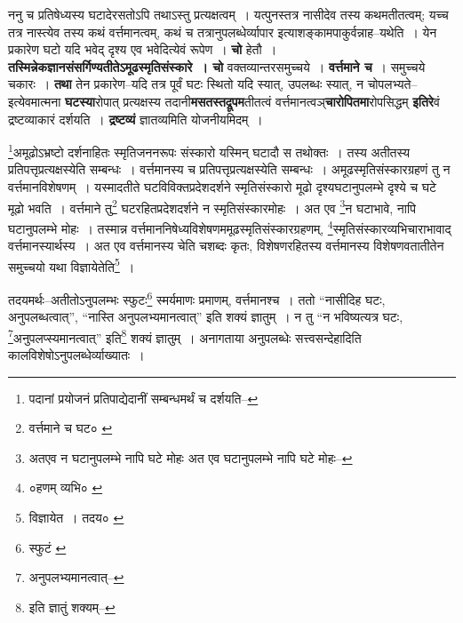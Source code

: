 \documentclass[article,12pt,a4paper]{memoir}
\begin{document}
	  \pstart ननु च प्रतिषेध्यस्य घटादेरसतोऽपि तथाऽस्तु प्रत्यक्षत्वम् । यत्पुनस्तत्र नासीदेव तस्य कथमतीतत्वम्; यच्च तत्र नास्त्येव तस्य कथं वर्त्तमानत्वम्, कथं च तत्रानुपलब्धेर्व्यापार इत्याशङ्कामपाकुर्वन्नाह--यथेति । येन प्रकारेण घटो यदि भवेद् दृश्य एव भवेदित्येवं रूपेण । \textbf{चो} हेतौ । \textbf{तस्मिन्नेकज्ञानसंसर्गिण्यतीतेऽमूढस्मृतिसंस्कारे । चो} वक्तव्यान्तरसमुच्चये । \textbf{वर्त्तमाने च} । समुच्चये चकारः । \textbf{तथा} तेन प्रकारेण--यदि तत्र पूर्वं घटः स्थितो यदि स्यात्, उपलब्धः स्यात्, न चोपलभ्यते--इत्येवमात्मना \textbf{घटस्या}रोपात् प्रत्यक्षस्य तदानी\textbf{मसतस्तद्रूपम}तीतत्वं वर्त्तमानत्वञ्\textbf{चारोपितमा}रोपसिद्धम् \textbf{इतिरे}वं द्रष्टव्याकारं दर्शयति । \textbf{द्रष्टव्यं} ज्ञातव्यमिति योजनीयमिदम् ।
	\pend
	  \bigskip
	  \begingroup
	

	  \pstart \footnote{पदानां प्रयोजनं प्रतिपाद्येदानीं सम्बन्धमर्थं च दर्शयति--\cite{dp-msD-n}}\-अमूढोऽभ्रष्टो दर्शनाहितः स्मृतिजननरूपः संस्कारो यस्मिन् घटादौ स तथोक्तः । तस्य अतीतस्य प्रतिपत्तृप्रत्यक्षस्येति सम्बन्धः । वर्त्तमानस्य च प्रतिपत्तृप्रत्यक्षस्येति सम्बन्धः । अमूढस्मृतिसंस्कारग्रहणं तु न वर्त्तमानविशेषणम् । यस्मादतीते घटविविक्तप्रदेशदर्शने स्मृतिसंस्कारो मूढो दृश्यघटानुपलम्भे दृश्ये च घटे मूढो भवति । वर्त्तमाने तु\footnote{वर्त्तमाने च घट० \cite{dp-msA} \cite{dp-msB} \cite{dp-edP} \cite{dp-edH} \cite{dp-edE} \cite{dp-edN}} घटरहितप्रदेशदर्शने न स्मृतिसंस्कारमोहः । अत एव \footnote{अतएव न घटानुपलम्भे नापि घटे मोहः \cite{dp-msA} \cite{dp-msC} \cite{dp-msD} \cite{dp-edP} \cite{dp-edH} \cite{dp-edE} \cite{dp-edN} अत एव घटानुपलम्भे नापि घटे मोहः--\cite{dp-msB}}\-न घटाभावे, नापि घटानुपलम्भे मोहः । तस्मान्न वर्त्तमाननिषेध्यविशेषणममूढस्मृतिसंस्कारग्रहणम्, \footnote{०हणम् व्यभि० \cite{dp-msC}}\-स्मृतिसंस्कारव्यभिचाराभावाद् वर्त्तमानस्यार्थस्य । अत एव वर्त्तमानस्य चेति चशब्दः कृतः, विशेषणरहितस्य वर्त्तमानस्य विशेषणवतातीतेन समुच्चयो यथा विज्ञायेतेति\footnote{विज्ञायेत । तदय० \cite{dp-msB}} ।
	\pend
       

	  \pstart तदयमर्थः--अतीतोऽनुपलम्भः स्फुटः\footnote{स्फुटं \cite{dp-msB} \cite{dp-edP} \cite{dp-edH} \cite{dp-edE} \cite{dp-edN}} स्मर्यमाणः प्रमाणम्, वर्त्तमानश्च । ततो “नासीदिह घटः, अनुपलब्धत्वात्”, “नास्ति अनुपलभ्यमानत्वात्” इति शक्यं ज्ञातुम् । न तु “न भविष्यत्यत्र घटः, \footnote{अनुपलभ्यमानत्वात्--\cite{dp-msA}}\-अनुपलप्स्यमानत्वात्” इति\footnote{इति ज्ञातुं शक्यम्--\cite{dp-msC}} शक्यं ज्ञातुम् । अनागताया अनुपलब्धेः सत्त्वसन्देहादिति कालविशेषोऽनुपलब्धेर्व्याख्यातः ।
	\pend
      
	  \endgroup
	
\end{document}
